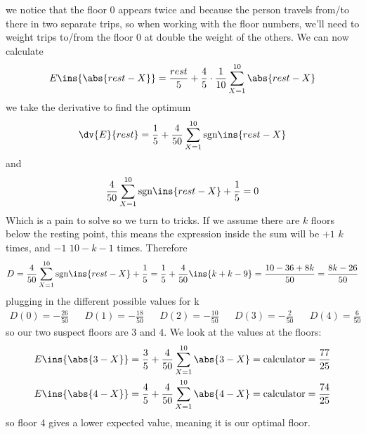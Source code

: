 we notice that the floor \(0\) appears twice and because the person travels from/to there in two separate trips, so when working with the floor numbers, we'll need to weight trips to/from the floor \(0\) at double the weight of the others. We can now calculate
\begin{equation}
	E\ins{\abs{rest-X}}=\frac{rest}{5}+\frac{4}{5}\cdot\frac{1}{10}\sum_{X=1}^{10}\abs{rest-X}
\end{equation}
we take the derivative to find the optimum
\begin{equation}
	\dv{E}{rest}=\frac{1}{5}+\frac{4}{50}\sum_{X=1}^{10}\text{sgn}\ins{rest-X}
\end{equation}
and 
\begin{equation}
	\frac{4}{50}\sum_{X=1}^{10}\text{sgn}\ins{rest-X} + \frac{1}{5}=0
\end{equation}
Which is a pain to solve so we turn to tricks. If we assume there are \(k\) floors below the resting point, this means the expression inside the sum will be \(+1\) \(k\) times, and \(-1\) \(10-k-1\) times. Therefore 
\begin{equation}
	D=\frac{4}{50}\sum_{X=1}^{10}\text{sgn}\ins{rest-X} + \frac{1}{5} = \frac{1}{5}+\frac{4}{50}\ins{k+k-9}=\frac{10-36+8k}{50}=\frac{8k-26}{50}
\end{equation}
plugging in the different possible values for k
\begin{align}
	D(0)=-\frac{26}{50}&&D(1)=-\frac{18}{50}&&D(2)=-\frac{10}{50}&&D(3)=-\frac{2}{50} && D(4)=\frac{6}{50}
\end{align}
so our two suspect floors are \(3\) and \(4\). We look at the values at the floors:
\begin{align}
	E\ins{\abs{3-X}}&=\frac{3}{5}+\frac{4}{50}\sum_{X=1}^{10}\abs{3-X}=\text{calculator}=\frac{77}{25}\\
	E\ins{\abs{4-X}}&=\frac{4}{5}+\frac{4}{50}\sum_{X=1}^{10}\abs{4-X}=\text{calculator}=\frac{74}{25}
\end{align}
so floor 4 gives a lower expected value, meaning it is our optimal floor.